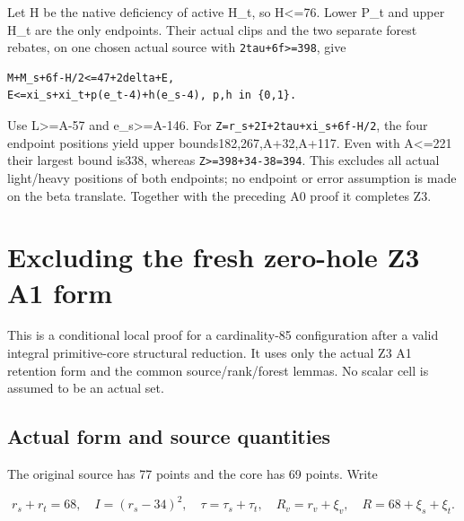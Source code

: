 \documentclass[10pt,a4paper]{article}
\theoremstyle{definition}
\begin{document}
Let H be the native deficiency of active H\_\allowbreak{}t,\allowbreak{} so H\textless=\allowbreak{}76. Lower
P\_\allowbreak{}t and upper H\_\allowbreak{}t are the only endpoints. Their actual clips and the
two separate forest rebates,\allowbreak{} on one chosen actual source with
\texttt{2tau+\allowbreak{}6f>=\allowbreak{}398},\allowbreak{} give

\begin{lstlisting}
M+M_s+6f-H/2<=47+2delta+E,
E<=xi_s+xi_t+p(e_t-4)+h(e_s-4), p,h in {0,1}.
\end{lstlisting}

Use L\textgreater=\allowbreak{}A-57 and e\_\allowbreak{}s\textgreater=\allowbreak{}A-146. For
\texttt{Z=\allowbreak{}r\_\allowbreak{}\allowbreak{}s+\allowbreak{}2I+\allowbreak{}2tau+\allowbreak{}xi\_\allowbreak{}\allowbreak{}s+\allowbreak{}6f-H/\allowbreak{}2},\allowbreak{} the four endpoint
positions yield upper bounds182,\allowbreak{}267,\allowbreak{}A+\allowbreak{}32,\allowbreak{}A+\allowbreak{}117. Even with A\textless=\allowbreak{}221
their largest bound is338,\allowbreak{} whereas
\texttt{Z>=\allowbreak{}398+\allowbreak{}34-38=\allowbreak{}394}. This excludes all actual
light/heavy positions of both endpoints; no endpoint or error assumption
is made on the beta translate. Together with the preceding A0 proof it
completes Z3.

\clearpage
\hypertarget{excluding-the-fresh-zero-hole-z3-a1-form}{%
\section{Excluding the fresh zero-hole Z3 A1
form}\label{excluding-the-fresh-zero-hole-z3-a1-form}}

This is a conditional local proof for a cardinality-85 configuration
after a valid integral primitive-core structural reduction. It uses only
the actual Z3 A1 retention form and the common source/rank/forest
lemmas. No scalar cell is assumed to be an actual set.

\hypertarget{actual-form-and-source-quantities}{%
\subsection{Actual form and source
quantities}\label{actual-form-and-source-quantities}}

The original source has 77 points and the core has 69 points. Write

\[
r_s+\allowbreak{}r_t=\allowbreak{}68,\allowbreak{}\quad I=\allowbreak{}(r_s-34)^2,\allowbreak{}\quad
\tau=\allowbreak{}\tau_s+\allowbreak{}\tau_t,\allowbreak{}\quad R_v=\allowbreak{}r_v+\allowbreak{}\xi_v,\allowbreak{}\quad R=\allowbreak{}68+\allowbreak{}\xi_s+\allowbreak{}\xi_t.
\]
\end{document}
